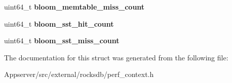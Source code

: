 \begin{DoxyCompactItemize}
\item 
uint64\+\_\+t {\bfseries bloom\+\_\+memtable\+\_\+miss\+\_\+count}\hypertarget{structrocksdb_1_1PerfContext_affe4959eb50abb55ce766ac4a668194d}{}\label{structrocksdb_1_1PerfContext_affe4959eb50abb55ce766ac4a668194d}

\item 
uint64\+\_\+t {\bfseries bloom\+\_\+sst\+\_\+hit\+\_\+count}\hypertarget{structrocksdb_1_1PerfContext_a73c0208deb4a468ce25ea95e38f5f8f5}{}\label{structrocksdb_1_1PerfContext_a73c0208deb4a468ce25ea95e38f5f8f5}

\item 
uint64\+\_\+t {\bfseries bloom\+\_\+sst\+\_\+miss\+\_\+count}\hypertarget{structrocksdb_1_1PerfContext_a98783a9f14db46800a71881d777c024b}{}\label{structrocksdb_1_1PerfContext_a98783a9f14db46800a71881d777c024b}

\end{DoxyCompactItemize}


The documentation for this struct was generated from the following file\+:\begin{DoxyCompactItemize}
\item 
Appserver/src/external/rocksdb/perf\+\_\+context.\+h\end{DoxyCompactItemize}
